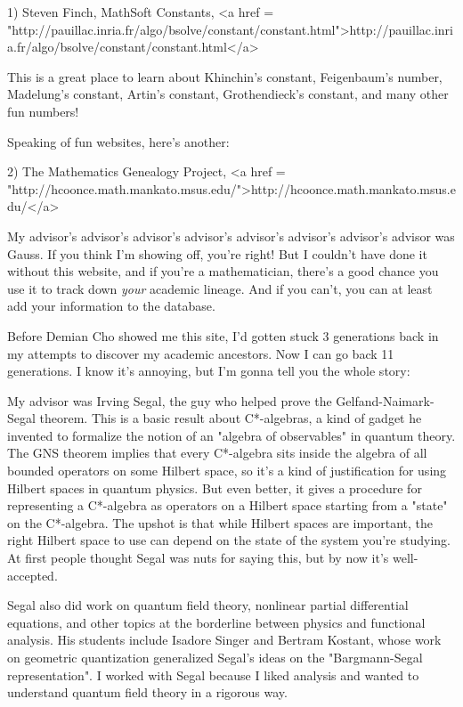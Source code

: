 1) Steven Finch, MathSoft Constants,
<a href = "http://pauillac.inria.fr/algo/bsolve/constant/constant.html">http://pauillac.inria.fr/algo/bsolve/constant/constant.html</a>

This is a great place to learn about Khinchin's constant,
Feigenbaum's number, Madelung's constant, Artin's constant, 
Grothendieck's constant, and many other fun numbers!   

Speaking of fun websites, here's another:

2) The Mathematics Genealogy Project, <a href = "http://hcoonce.math.mankato.msus.edu/">http://hcoonce.math.mankato.msus.edu/</a>

My advisor's advisor's advisor's advisor's advisor's advisor's
advisor's advisor was Gauss.  If you think I'm showing off, you're
right!  But I couldn't have done it without this website, and if
you're a mathematician, there's a good chance you use it to track 
down \emph{your} academic lineage.  And if you can't, you can at least 
add your information to the database.

Before Demian Cho showed me this site, I'd gotten stuck 3 generations
back in my attempts to discover my academic ancestors.  Now I can go
back 11 generations.  I know it's annoying, but I'm gonna tell you the
whole story:

My advisor was Irving Segal, the guy who helped prove the
Gelfand-Naimark-Segal theorem.  This is a basic result about
C*-algebras, a kind of gadget he invented to formalize the notion of
an "algebra of observables" in quantum theory.  The GNS theorem
implies that every C*-algebra sits inside the algebra of all bounded
operators on some Hilbert space, so it's a kind of justification for
using Hilbert spaces in quantum physics.  But even better, it gives a
procedure for representing a C*-algebra as operators on a Hilbert
space starting from a "state" on the C*-algebra.  The upshot is that
while Hilbert spaces are important, the right Hilbert space to use can
depend on the state of the system you're studying.  At first people 
thought Segal was nuts for saying this, but by now it's well-accepted.

Segal also did work on quantum field theory, nonlinear partial
differential equations, and other topics at the borderline between
physics and functional analysis.  His students include Isadore Singer
and Bertram Kostant, whose work on geometric quantization generalized
Segal's ideas on the "Bargmann-Segal representation".  I worked with
Segal because I liked analysis and wanted to understand quantum field
theory in a rigorous way.  


